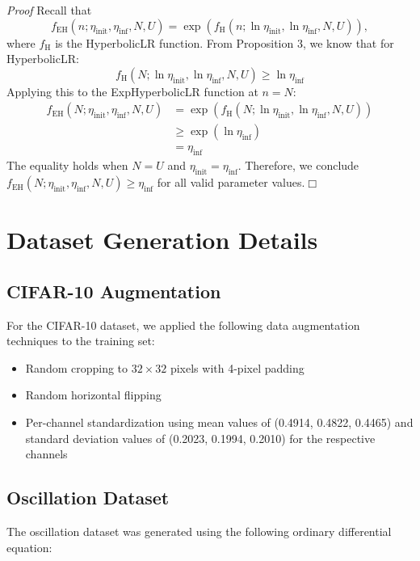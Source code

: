 \documentclass{article}
\theoremstyle{plain}
\theoremstyle{definition}
\theoremstyle{remark}
\begin{document}
\noindent \textit{Proof}
Recall that 
\begin{equation*}
f_{\text{EH}}(n; \eta_\text{init}, \eta_\text{inf}, N, U) = \exp(f_{\text{H}}(n; \ln \eta_\text{init}, \ln \eta_\text{inf}, N, U)),
\end{equation*}
where $f_{\text{H}}$ is the HyperbolicLR function.
From Proposition 3, we know that for HyperbolicLR:
\[ f_{\text{H}}(N; \ln \eta_\text{init}, \ln \eta_\text{inf}, N, U) \geq \ln \eta_\text{inf} \]
Applying this to the ExpHyperbolicLR function at $n = N$:
\begin{align*}
f_{\text{EH}}(N; \eta_\text{init}, \eta_\text{inf}, N, U) &= \exp(f_{\text{H}}(N; \ln \eta_\text{init}, \ln \eta_\text{inf}, N, U)) \\
  &\geq \exp(\ln \eta_\text{inf}) \\
  &= \eta_\text{inf}
\end{align*}
The equality holds when $N = U$ and $\eta_\text{init} = \eta_\text{inf}$.
Therefore, we conclude $f_{\text{EH}}(N; \eta_\text{init}, \eta_\text{inf}, N, U) \geq \eta_\text{inf}$ for all valid parameter values.\hfill$\Box$

\section{Dataset Generation Details}
\label{sec:dataset_generation}

\subsection{CIFAR-10 Augmentation}

For the CIFAR-10 dataset, we applied the following data augmentation techniques to the training set:
\begin{itemize}
    \item Random cropping to $32 \times 32$ pixels with 4-pixel padding
    \item Random horizontal flipping
    \item Per-channel standardization using mean values of (0.4914, 0.4822, 0.4465) and standard deviation values of (0.2023, 0.1994, 0.2010) for the respective channels
\end{itemize}

\subsection{Oscillation Dataset}

The oscillation dataset was generated using the following ordinary differential equation:
\end{document}
